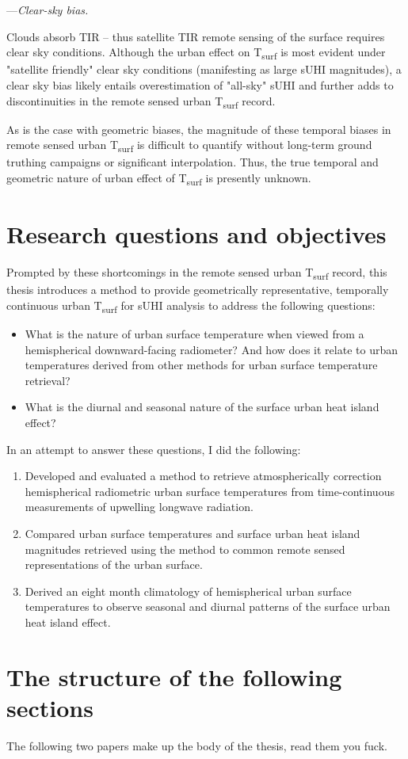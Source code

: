 \noindent---\textit{Clear-sky bias.}

Clouds absorb TIR – thus satellite TIR remote sensing of the surface requires clear sky conditions. Although the urban effect on T\textsubscript{surf} is most evident under "satellite friendly" clear sky conditions (manifesting as large sUHI magnitudes), a clear sky bias likely entails overestimation of "all-sky" sUHI and further adds to discontinuities in the remote sensed urban T\textsubscript{surf} record.

As is the case with geometric biases, the magnitude of these temporal biases in remote sensed urban T\textsubscript{surf} is difficult to quantify without long-term ground truthing campaigns or significant interpolation. Thus, the true temporal and geometric nature of urban effect of T\textsubscript{surf} is presently unknown.
 
\section{Research questions and objectives}

Prompted by these shortcomings in the remote sensed urban T\textsubscript{surf} record, this thesis introduces a method to provide geometrically representative, temporally continuous urban T\textsubscript{surf} for sUHI analysis to address the following questions:

\begin{itemize}
	\item What is the nature of urban surface temperature when viewed from a hemispherical downward-facing radiometer? And how does it relate to urban temperatures derived from other methods for urban surface temperature retrieval?
	\item What is the diurnal and seasonal nature of the surface urban heat island effect?
\end{itemize}

\noindent In an attempt to answer these questions, I did the following:

\begin{enumerate}
	\item Developed and evaluated a method to retrieve atmospherically correction hemispherical radiometric urban surface temperatures from time-continuous measurements of upwelling longwave radiation.
	\item Compared urban surface temperatures and surface urban heat island magnitudes retrieved using the method to common remote sensed representations of the urban surface.
	\item Derived an eight month climatology of hemispherical urban surface temperatures to observe seasonal and diurnal patterns of the surface urban heat island effect.
\end{enumerate}

\section{The structure of the following sections}

The following two papers make up the body of the thesis, read them you fuck.
